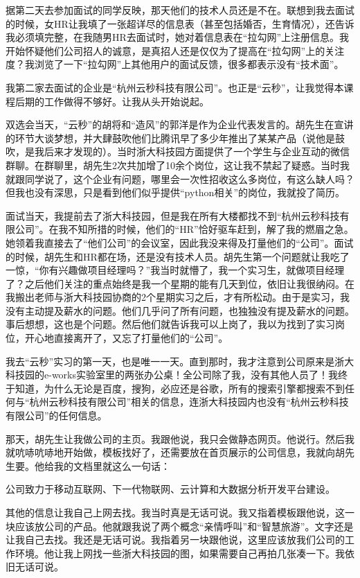 \documentclass[	10pt，a4paper， UTF8]{ctexart}
\begin{document}
据第二天去参加面试的同学反映，那天他们的技术人员还是不在。联想到我去面试的时候，女HR让我填了一张超详尽的信息表（甚至包括婚否，生育情况），还告诉我必须填完整，在我随男HR去面试时，她对着信息表在“拉勾网”上注册信息。我开始怀疑他们公司招人的诚意，是真招人还是仅仅为了提高在“拉勾网”上的关注度？我浏览了一下“拉勾网”上其他用户的面试反馈，很多都表示没有“技术面”。

我第二家去面试的企业是“杭州云秒科技有限公司”。也正是“云秒”，让我觉得本课程后期的工作做得不够好。让我从头开始说起。

双选会当天，“云秒”的胡将和“造风”的郭洋是作为企业代表发言的。胡先生在宣讲的环节大谈梦想，并大肆鼓吹他们比腾讯早了多少年推出了某某产品（说他是鼓吹，是我后来才发现的）。当时浙大科技园方面提供了一个学生与企业互动的微信群聊。在群聊里，胡先生2次共加增了10余个岗位，这让我不禁起了疑惑。当时我就跟同学说了，这个企业有问题，哪里会一次性招收这么多岗位，有这么缺人吗？但我也没有深思，只是看到他们似乎提供“python相关”的岗位，我就投了简历。

面试当天，我提前去了浙大科技园，但是我在所有大楼都找不到“杭州云秒科技有限公司”。在我不知所措的时候，他们的“HR”恰好驱车赶到，解了我的燃眉之急。她领着我直接去了“他们公司”的会议室，因此我没来得及打量他们的“公司”。面试的时候，胡先生和HR都在场，还是没有技术人员。胡先生第一个问题就让我吃了一惊，“你有兴趣做项目经理吗？”我当时就懵了，我一个实习生，就做项目经理了？之后他们关注的重点始终是我一个星期的能有几天到位，依旧让我很纳闷。在我搬出老师与浙大科技园协商的2个星期实习之后，才有所松动。由于是实习，我没有主动提及薪水的问题。他们几乎问了所有问题，也独独没有提及薪水的问题。事后想想，这也是个问题。然后他们就告诉我可以上岗了，我以为找到了实习岗位，开心地直接离开了，又忘了打量他们的“公司”。

我去“云秒”实习的第一天，也是唯一一天。直到那时，我才注意到公司原来是浙大科技园的e-works实验室里的两张办公桌！全公司除了我，没有其他人员了！我终于知道，为什么无论是百度，搜狗，必应还是谷歌，所有的搜索引擎都搜索不到任何与“杭州云秒科技有限公司”相关的信息，连浙大科技园内也没有“杭州云秒科技有限公司”的任何信息。

那天，胡先生让我做公司的主页。我跟他说，我只会做静态网页。他说行。然后我就吭哧吭哧地开始做，模板找好了，还需要放在首页展示的公司信息，我就向胡先生要。他给我的文档里就这么一句话：

公司致力于移动互联网、下一代物联网、云计算和大数据分析开发平台建设。

其他的信息让我自己上网去找。我当时真是无话可说。我又指着模板跟他说，这一块应该放公司的产品。他就跟我说了两个概念“亲情呼叫”和“智慧旅游”。文字还是让我自己去找。我还是无话可说。我指着另一块跟他说，这里应该放我们公司的工作环境。他让我上网找一些浙大科技园的图，如果需要自己再拍几张凑一下。我依旧无话可说。
\end{document}
